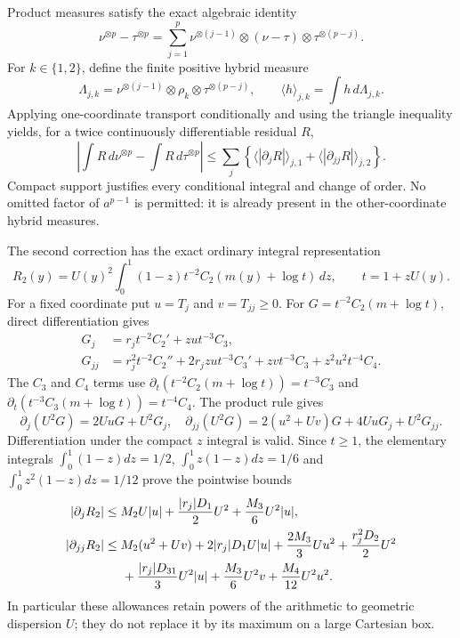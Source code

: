 Product measures satisfy the exact algebraic identity
\[
 \nu^{\otimes p}-\tau^{\otimes p}
 =\sum_{j=1}^p\nu^{\otimes(j-1)}\otimes(\nu-\tau)
             \otimes\tau^{\otimes(p-j)}.
\]
For $k\in\{1,2\}$, define the finite positive hybrid measure
\[
 \Lambda_{j,k}=\nu^{\otimes(j-1)}\otimes\rho_k
                         \otimes\tau^{\otimes(p-j)},\qquad
 \langle h\rangle_{j,k}=\int h\,d\Lambda_{j,k}.
\]
Applying one-coordinate transport conditionally and using the triangle
inequality yields, for a twice continuously differentiable residual $R$,
\begin{equation}
 \left|\int R\,d\nu^{\otimes p}-\int R\,d\tau^{\otimes p}\right|
 \leq\sum_j\left\{\langle|\partial_jR|\rangle_{j,1}
                    +\langle|\partial_{jj}R|\rangle_{j,2}\right\}.
 \label{supp:eq:tensor-positive-transport}
\end{equation}
Compact support justifies every conditional integral and change of order.
No omitted factor of $a^{p-1}$ is permitted: it is already present in the
other-coordinate hybrid measures.

The second correction has the exact ordinary integral representation
\[
 R_2(y)=U(y)^2\int_0^1(1-z)t^{-2}
                 C_2(m(y)+\log t)\,dz,\qquad t=1+zU(y).
\]
For a fixed coordinate put $u=T_j$ and $v=T_{jj}\geq0$. For
$G=t^{-2}C_2(m+\log t)$, direct differentiation gives
\begin{align*}
 G_j&=r_jt^{-2}C_2'+zu t^{-3}C_3,\\
 G_{jj}&=r_j^2t^{-2}C_2''+2r_jzu t^{-3}C_3'
                       +zv t^{-3}C_3+z^2u^2t^{-4}C_4.
\end{align*}
The $C_3$ and $C_4$ terms use
$\partial_t(t^{-2}C_2(m+\log t))=t^{-3}C_3$ and
$\partial_t(t^{-3}C_3(m+\log t))=t^{-4}C_4$.
The product rule gives
\[
 \partial_j(U^2G)=2UuG+U^2G_j,
\quad
 \partial_{jj}(U^2G)=2(u^2+Uv)G+4UuG_j+U^2G_{jj}.
\]
Differentiation under the compact $z$ integral is valid. Since $t\geq1$,
the elementary integrals
$\int_0^1(1-z)dz=1/2$, $\int_0^1z(1-z)dz=1/6$ and
$\int_0^1z^2(1-z)dz=1/12$ prove the pointwise bounds
\begin{align*}
 |\partial_jR_2|
 &\leq M_2U|u|+\frac{|r_j|D_1}{2}U^2
                  +\frac{M_3}{6}U^2|u|,\\
 |\partial_{jj}R_2|
 &\leq M_2(u^2+Uv)+2|r_j|D_1U|u|
       +\frac{2M_3}{3}Uu^2+\frac{r_j^2D_2}{2}U^2\\
 &\hspace{5mm}+\frac{|r_j|D_{31}}{3}U^2|u|
       +\frac{M_3}{6}U^2v+\frac{M_4}{12}U^2u^2.
\end{align*}
In particular these allowances retain powers of the arithmetic to
geometric dispersion $U$; they do not replace it by its maximum on a
large Cartesian box.

